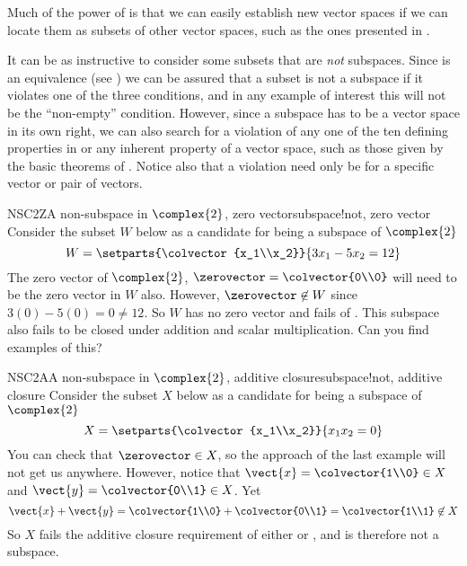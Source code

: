 %
Much of the power of  is that we can easily establish new vector spaces if we can locate them as subsets of other vector spaces, such as the ones presented in .\par
%
It can be as instructive to consider some subsets that are {\em not} subspaces.  Since  is an equivalence (see ) we can be assured that a subset is not a subspace if it violates one of the three conditions, and in any example of interest this will not be the ``non-empty'' condition.  However, since a subspace has to be a vector space in its own right, we can also search for a violation of any one of the ten defining properties in  or any inherent property of a vector space, such as those given by the basic theorems of .  Notice also that a violation need only be for a specific vector or pair of vectors.
%
\begin{example}{NSC2Z}{A non-subspace in $\complex{2}$, zero vector}{subspace!not, zero vector}
Consider the subset $W$ below as a candidate for being a subspace of $\complex{2}$
%
\begin{equation*}
W=\setparts{\colvector{x_1\\x_2}}{3x_1-5x_2=12}
\end{equation*}
%
The zero vector of $\complex{2}$, $\zerovector=\colvector{0\\0}$ will need to be the zero vector in $W$ also.  However, $\zerovector\not\in W$ since $3(0)-5(0)=0\neq 12$.  So $W$ has no zero vector and fails  of .  This subspace also fails to be closed under addition and scalar multiplication.  Can you find examples of this?
\end{example}
%
\begin{example}{NSC2A}{A non-subspace in $\complex{2}$, additive closure}{subspace!not, additive closure}
Consider the subset $X$ below as a candidate for being a subspace of $\complex{2}$
%
\begin{equation*}
X=\setparts{\colvector{x_1\\x_2}}{x_1x_2=0}
\end{equation*}
%
You can check that $\zerovector\in X$, so the approach of the last example will not get us anywhere.  However, notice that $\vect{x}=\colvector{1\\0}\in X$ and $\vect{y}=\colvector{0\\1}\in X$.  Yet
%
\begin{equation*}
\vect{x}+\vect{y}=\colvector{1\\0}+\colvector{0\\1}=\colvector{1\\1}\not\in X
\end{equation*}
%
So $X$ fails the additive closure requirement of either  or , and is therefore not a subspace.
\end{example}
